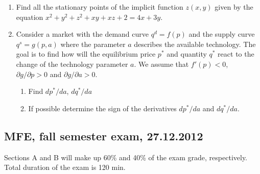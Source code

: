 \begin{enumerate}[resume]
\item Find all the stationary points of the implicit function $z(x,y)$ given  by the equation $x^2+y^2+z^2+xy+xz+2=4x+3y$.

\item Consider a market with the demand curve $q^d=f(p)$ and the supply curve $q^s=g(p,a)$ where the parameter $a$ describes the available technology. The goal is to find how will the equilibrium price $p^*$ and quantity $q^*$ react to the change of the technology parameter $a$. We assume that  $f'(p)<0$, $\partial g/\partial p>0$ and $\partial g/\partial a>0$.
\begin{enumerate}
\item Find $dp^*/da$, $dq^*/da$
\item If possible determine the sign of the derivatives $dp^*/da$ and $dq^*/da$.
\end{enumerate}

\end{enumerate}


\subsection{MFE, fall semester exam, 27.12.2012}

Sections A and B will make up 60\% and 40\% of the exam grade, respectively. Total duration of the exam is 120 min.

